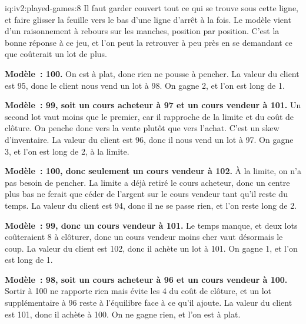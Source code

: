 \begin{solution}{iq:iv2:played-games:8}
Il faut garder couvert tout ce qui se trouve sous cette ligne, et faire glisser la feuille vers le bas d'une ligne d'arrêt à la fois. Le modèle vient d'un raisonnement à rebours sur les manches, position par position. C'est la bonne réponse à ce jeu, et l'on peut la retrouver à peu près en se demandant ce que coûterait un lot de plus.

\ivstop
\textbf{Modèle~: 100.} On est à plat, donc rien ne pousse à pencher. La valeur du client est 95, donc le client nous vend un lot à 98. On gagne 2, et l'on est long de 1.

\ivstop
\textbf{Modèle~: 99, soit un cours acheteur à 97 et un cours vendeur à 101.} Un second lot vaut moins que le premier, car il rapproche de la limite et du coût de clôture. On penche donc vers la vente plutôt que vers l'achat. C'est un skew d'inventaire. La valeur du client est 96, donc il nous vend un lot à 97. On gagne 3, et l'on est long de 2, à la limite.

\ivstop
\textbf{Modèle~: 100, donc seulement un cours vendeur à 102.} À la limite, on n'a pas besoin de pencher. La limite a déjà retiré le cours acheteur, donc un centre plus bas ne ferait que céder de l'argent sur le cours vendeur tant qu'il reste du temps. La valeur du client est 94, donc il ne se passe rien, et l'on reste long de 2.

\ivstop
\textbf{Modèle~: 99, donc un cours vendeur à 101.} Le temps manque, et deux lots coûteraient 8 à clôturer, donc un cours vendeur moins cher vaut désormais le coup. La valeur du client est 102, donc il achète un lot à 101. On gagne 1, et l'on est long de 1.

\ivstop
\textbf{Modèle~: 98, soit un cours acheteur à 96 et un cours vendeur à 100.} Sortir à 100 ne rapporte rien mais évite les 4 du coût de clôture, et un lot supplémentaire à 96 reste à l'équilibre face à ce qu'il ajoute. La valeur du client est 101, donc il achète à 100. On ne gagne rien, et l'on est à plat.


\end{solution}
